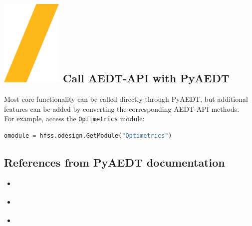 \documentclass[9pt,landscape]{article}
\begin{document}
\begin{multicols}{3}
\section{\includegraphics[height=\fontcharht\font`\S]{slash.png} Call AEDT-API with PyAEDT}
Most core functionality can be called directly through PyAEDT, but additional features can be added by converting the corresponding AEDT-API methods.
\newline
\\
For example, access the \texttt{Optimetrics} module:
\begin{lstlisting}[language=Python]
omodule = hfss.odesign.GetModule("Optimetrics")
\end{lstlisting}

\subsection{References from PyAEDT documentation}
\begin{itemize}
\item \href{https://aedt.docs.pyansys.com/version/stable/Getting_started/index.html}{\color{blue}{Getting started}}
\item \href{https://aedt.docs.pyansys.com/version/stable/User_guide/index.html}{\color{blue}{User guide}}
\item \href{https://aedt.docs.pyansys.com/version/stable/API/index.html}{\color{blue}{API reference}}
\end{itemize}
\end{multicols}
\vspace{-0.15cm}
\noindent\makebox[\linewidth]{\rule{\paperwidth}{4pt}}
\end{document}
